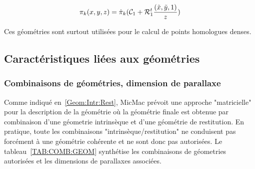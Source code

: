 \begin{equation}
   \pi_k(x,y,z) = 
    \PiI_k( \mathcal{C}_1 + \mathcal{R}^t_1 \frac{(\tilde{x},\tilde{y},1)}{z})
\end{equation}

Ces g\'eom\'etries sont surtout utilis\'ees
pour le calcul de points homologues denses.



\subsection{Caract\'eristiques li\'ees aux g\'eom\'etries}

\subsubsection{Combinaisons de g\'eom\'etries, dimension de parallaxe}

Comme indiqu\'e en~\ref{Geom:Intr:Rest}, MicMac pr\'evoit une approche
"matricielle" pour la description de la g\'eom\'etrie  o\`u la g\'eom\'etrie
finale est obtenue par combinaison d'une g\'eometrie intrins\`eque et d'une
g\'eom\'etrie de restitution.  En pratique, toute les combinaisons 
"intrins\`eque/restitution" ne conduisent pas forc\'ement \`a une g\'eom\'etrie
coh\'erente et ne sont donc pas autoris\'ees. Le tableau~\ref{TAB:COMB:GEOM}
synth\'etise les combinaisons de g\'eometries autoris\'ees et les dimensions
de parallaxes associ\'ees.


